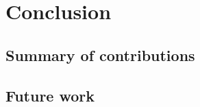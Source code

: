 \chapter{Conclusion}\label{ch:conclusion}


\section{Summary of contributions}\label{sec:summary}

\section{Future work}\label{sec:future-work}
